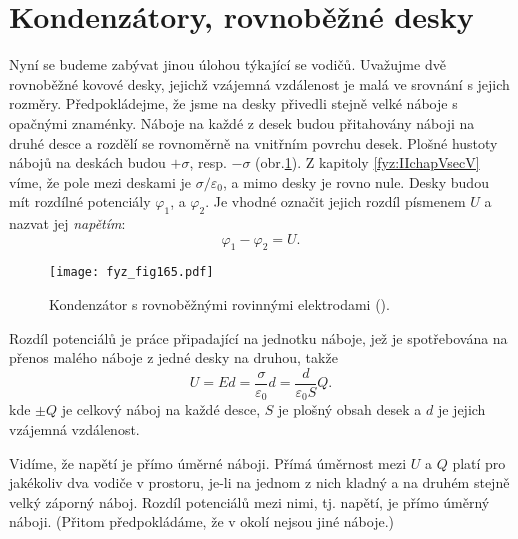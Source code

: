 \section{Kondenzátory, rovnoběžné desky}\label{fyz:IIchapVsecXIX}
  Nyní se budeme zabývat jinou úlohou týkající se vodičů. Uvažujme dvě rovnoběžné kovové 
  desky, jejichž vzájemná vzdálenost je malá ve srovnání s jejich rozměry. Předpokládejme, že jsme
  na desky přivedli stejně velké náboje s opačnými znaménky. Náboje na každé z desek budou 
  přitahovány náboji na druhé desce a rozdělí se rovnoměrně na vnitřním povrchu desek. Plošné
  hustoty nábojů na deskách budou \(+\sigma\), resp. \(-\sigma\) (obr.\ref{fyz:fig165}). Z kapitoly 
  \ref{fyz:IIchapVsecV} víme, že pole mezi deskami je \(\sigma/\varepsilon_0\), a mimo desky je 
  rovno nule. Desky budou mít rozdílné potenciály \(\varphi_1\), a \(\varphi_2\). Je vhodné označit 
  jejich rozdíl písmenem \(U\) a nazvat jej \emph{napětím}:
  \begin{equation}\label{fyz:eq292}
    \varphi_1 - \varphi_2 = U.
  \end{equation}
  
  \begin{figure}[ht!]  %
    \centering
    \texttt{[image: fyz\_fig165.pdf]}
    \caption{Kondenzátor s rovnoběžnými rovinnými elektrodami 
             (\cite[s.~114]{Feynman02}).}
    \label{fyz:fig165}
  \end{figure}
  
  Rozdíl potenciálů je práce připadající na jednotku náboje, jež je spotřebována na přenos malého 
  náboje z jedné desky na druhou, takže
  \begin{equation}\label{fyz:eq293}
    U = Ed = \dfrac{\sigma}{\varepsilon_0}d = \dfrac{d}{\varepsilon_0S}Q.
  \end{equation}
  kde \(\pm Q\) je celkový náboj na každé desce, \(S\) je plošný obsah desek a \(d\) je jejich 
  vzájemná vzdálenost.
  
  Vidíme, že napětí je přímo úměrné náboji. Přímá úměrnost mezi \(U\) a \(Q\) platí pro jakékoliv 
  dva vodiče v prostoru, je-li na jednom z nich kladný a na druhém stejně velký záporný náboj. 
  Rozdíl potenciálů mezi nimi, tj. napětí, je přímo úměrný náboji. (Přitom předpokládáme, že v 
  okolí nejsou jiné náboje.)
  
